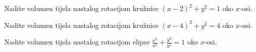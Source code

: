 \begin{example}
    Nadite volumen tijela nastalog rotacijom kružnice $(x-2)^2+y^2=1$ oko
    $x$-osi.
\end{example}

\begin{example}
    Nadite volumen tijela nastalog rotacijom kružnice $(x-4)^2+y^2=4$ oko
    $x$-osi.
\end{example}

\begin{example}
    Nadite volumen tijela nastalog rotacijom elipse
    $\frac{x^2}{a^2}+\frac{y^2}{b^2}=1$ oko $x$-osi.
\end{example}
